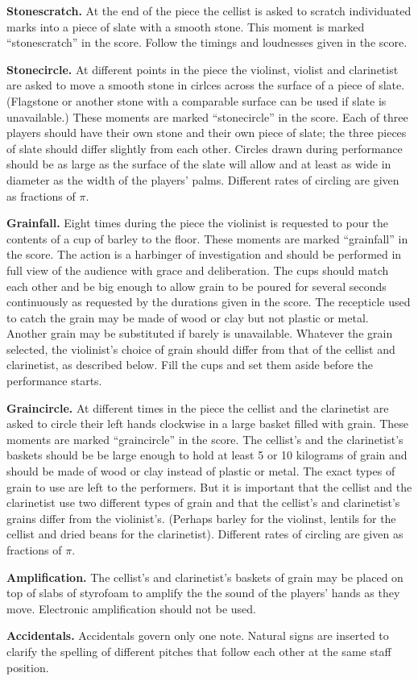 \documentclass[10pt]{article}
\begin{document}
\begin{textblock}{23}
\textbf{Stonescratch.} At the end of the piece the cellist is asked to scratch
individuated marks into a piece of slate with a smooth stone. This moment is
marked ``stonescratch'' in the score. Follow the timings and loudnesses given
in the score.

\textbf{Stonecircle.} At different points in the piece the violinst, violist
and clarinetist are asked to move a smooth stone in cirlces across the surface
of a piece of slate. (Flagstone or another stone with a comparable surface can
be used if slate is unavailable.) These moments are marked ``stonecircle'' in
the score. Each of three players should have their own stone and their own
piece of slate; the three pieces of slate should differ slightly from each
other. Circles drawn during performance should be as large as the surface of
the slate will allow and at least as wide in diameter as the width of the
players' palms. Different rates of circling are given as fractions of $\pi$.

\textbf{Grainfall.} Eight times during the piece the violinist is requested to
pour the contents of a cup of barley to the floor. These moments are marked
``grainfall'' in the score. The action is a harbinger of investigation and
should be performed in full view of the audience with grace and deliberation.
The cups should match each other and be big enough to allow grain to be poured
for several seconds continuously as requested by the durations given in the
score. The recepticle used to catch the grain may be made of wood or clay but
not plastic or metal. Another grain may be substituted if barely is
unavailable. Whatever the grain selected, the violinist's choice of grain
should differ from that of the cellist and clarinetist, as described below.
Fill the cups and set them aside before the performance starts.

\textbf{Graincircle.} At different times in the piece the cellist and the
clarinetist are asked to circle their left hands clockwise in a large basket
filled with grain. These moments are marked ``graincircle'' in the score.  The
cellist's and the clarinetist's baskets should be be large enough to hold at
least 5 or 10 kilograms of grain and should be made of wood or clay instead of
plastic or metal. The exact types of grain to use are left to the performers.
But it is important that the cellist and the clarinetist use two different
types of grain and that the cellist's and clarinetist's grains differ from the
violinist's. (Perhaps barley for the violinst, lentils for the cellist and
dried beans for the clarinetist). Different rates of circling are given as
fractions of $\pi$.

\textbf{Amplification.} The cellist's and clarinetist's baskets of grain may be
placed on top of slabs of styrofoam to amplify the the sound of the players'
hands as they move. Electronic amplification should not be used.

\textbf{Accidentals.} Accidentals govern only one note. Natural signs are
inserted to clarify the spelling of different pitches that follow each other at
the same staff position.

\end{textblock}
\end{document}
